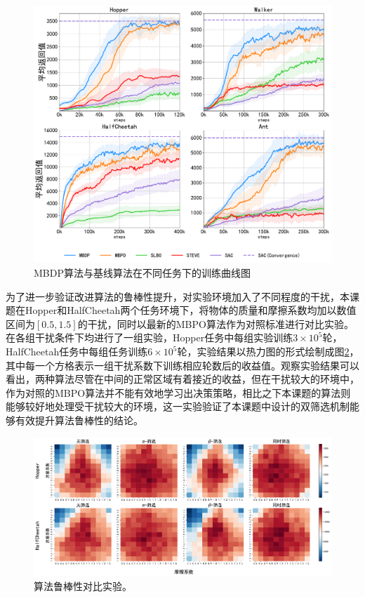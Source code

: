 \begin{figure}[t]
  \centering
  \includegraphics[width=\textwidth]{figures/performance.pdf}
  \caption{MBDP算法与基线算法在不同任务下的训练曲线图}
  \label{fig:performance}
\end{figure}

为了进一步验证改进算法的鲁棒性提升，对实验环境加入了不同程度的干扰，本课题在Hopper和HalfCheetah两个任务环境下，将物体的质量和摩擦系数均加以数值区间为$[0.5,1.5]$的干扰，同时以最新的MBPO算法作为对照标准进行对比实验。在各组干扰条件下均进行了一组实验，Hopper任务中每组实验训练$3\times 10^5$轮，HalfCheetah任务中每组任务训练$6\times 10^5$轮，实验结果以热力图的形式绘制成图\ref{fig:robustness-heatmap}，其中每一个方格表示一组干扰系数下训练相应轮数后的收益值。观察实验结果可以看出，两种算法尽管在中间的正常区域有着接近的收益，但在干扰较大的环境中，作为对照的MBPO算法并不能有效地学习出决策策略，相比之下本课题的算法则能够较好地处理受干扰较大的环境，这一实验验证了本课题中设计的双筛选机制能够有效提升算法鲁棒性的结论。

\begin{figure}[t]
  \centering
  \includegraphics[width=\textwidth]{figures/robustness-heatmap.pdf}
  \caption{算法鲁棒性对比实验。}
  \label{fig:robustness-heatmap}
\end{figure}

